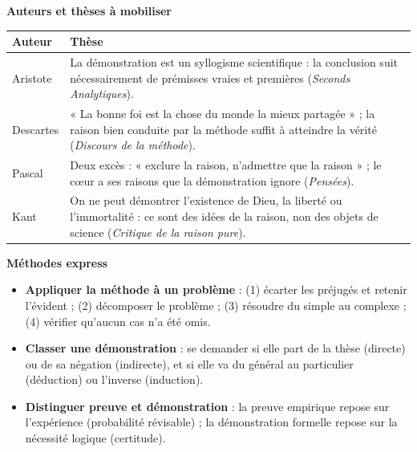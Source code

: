 \documentclass[11pt]{article}
\begin{document}
\begin{bilan}
\textbf{Auteurs et thèses à mobiliser}
\begin{center}
\begin{tabularx}{\linewidth}{|l|X|}
\hline
\rowcolor{popblueL} \textbf{Auteur} & \textbf{Thèse} \\
\hline
Aristote & La démonstration est un syllogisme scientifique : la conclusion suit nécessairement de prémisses vraies et premières (\emph{Seconds Analytiques}). \\
\hline
Descartes & « La bonne foi est la chose du monde la mieux partagée » ; la raison bien conduite par la méthode suffit à atteindre la vérité (\emph{Discours de la méthode}). \\
\hline
Pascal & Deux excès : « exclure la raison, n'admettre que la raison » ; le cœur a ses raisons que la démonstration ignore (\emph{Pensées}). \\
\hline
Kant & On ne peut démontrer l'existence de Dieu, la liberté ou l'immortalité : ce sont des idées de la raison, non des objets de science (\emph{Critique de la raison pure}). \\
\hline
\end{tabularx}
\end{center}

\textbf{Méthodes express}
\begin{itemize}
  \item \textbf{Appliquer la méthode à un problème} : (1) écarter les préjugés et retenir l'évident ; (2) décomposer le problème ; (3) résoudre du simple au complexe ; (4) vérifier qu'aucun cas n'a été omis.
  \item \textbf{Classer une démonstration} : se demander si elle part de la thèse (directe) ou de sa négation (indirecte), et si elle va du général au particulier (déduction) ou l'inverse (induction).
  \item \textbf{Distinguer preuve et démonstration} : la preuve empirique repose sur l'expérience (probabilité révisable) ; la démonstration formelle repose sur la nécessité logique (certitude).
\end{itemize}
\end{bilan}
\end{document}
